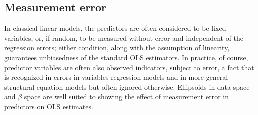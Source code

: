 \subsection{Measurement error}

In classical linear models, the predictors are often considered to be fixed
variables, or, if random, to be measured without error and independent of the regression errors;
either condition, along with the assumption of linearity, guarantees
unbiasedness of the standard OLS estimators.
In practice, of course, predictor variables are often also observed
indicators, subject to error, a fact that is recognized in errors-in-variables
regression models and in more general structural equation models
but often ignored otherwise.  Ellipsoids in data space and $\beta$ space
are well suited to showing the effect of measurement error in predictors on OLS estimates.


